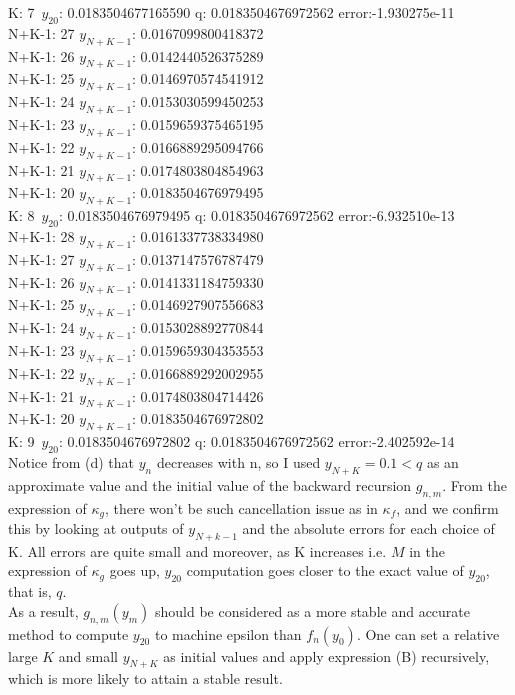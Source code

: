 \documentclass[12pt]{article}
\begin{document}
K:  7\ $y_{20}$:  0.0183504677165590 q:  0.0183504676972562 error:-1.930275e-11 \\
N+K-1:  27 $y_{N+K-1}$:   0.0167099800418372\\
N+K-1:  26 $y_{N+K-1}$:   0.0142440526375289\\
N+K-1:  25 $y_{N+K-1}$:   0.0146970574541912\\
N+K-1:  24 $y_{N+K-1}$:   0.0153030599450253\\
N+K-1:  23 $y_{N+K-1}$:   0.0159659375465195\\
N+K-1:  22 $y_{N+K-1}$:   0.0166889295094766\\
N+K-1:  21 $y_{N+K-1}$:   0.0174803804854963\\
N+K-1:  20 $y_{N+K-1}$:   0.0183504676979495\\
K:  8\ $y_{20}$:  0.0183504676979495 q:  0.0183504676972562 error:-6.932510e-13 \\
N+K-1:  28 $y_{N+K-1}$:   0.0161337738334980\\
N+K-1:  27 $y_{N+K-1}$:   0.0137147576787479\\
N+K-1:  26 $y_{N+K-1}$:   0.0141331184759330\\
N+K-1:  25 $y_{N+K-1}$:   0.0146927907556683\\
N+K-1:  24 $y_{N+K-1}$:   0.0153028892770844\\
N+K-1:  23 $y_{N+K-1}$:   0.0159659304353553\\
N+K-1:  22 $y_{N+K-1}$:   0.0166889292002955\\
N+K-1:  21 $y_{N+K-1}$:   0.0174803804714426\\
N+K-1:  20 $y_{N+K-1}$:   0.0183504676972802\\
K:  9\ $y_{20}$:  0.0183504676972802 q:  0.0183504676972562 error:-2.402592e-14 \\

Notice from (d) that $y_n$ decreases with n, so I used $y_{N+K}=0.1 < q$ as an approximate value and the initial value of the backward recursion $g_{n,m}$. From the expression of $\kappa_g$, there won't be such cancellation issue as in $\kappa_f$, and we confirm this by looking at outputs of $y_{N+k-1}$ and the absolute errors for each choice of K. All errors are quite small and moreover, as K increases i.e. $M$ in the expression of $\kappa_g$ goes up, $y_{20}$ computation goes closer to the exact value of $y_{20}$, that is, $q$.\\

As a result, $g_{n,m}(y_m)$ should be considered as a more stable and accurate method to compute $y_{20}$ to machine epsilon than $f_n(y_0)$. One can set a relative large $K$ and small $y_{N+K}$ as initial values and apply expression (B) recursively, which is more likely to attain a stable result. 
\end{document}
